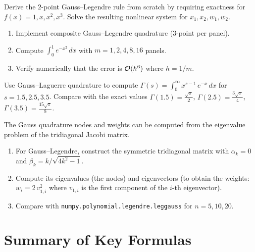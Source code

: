 \begin{exercise}[$\star\star$]
\label{ex:ch8-derive-gl2}
Derive the $2$-point Gauss--Legendre rule from scratch by requiring exactness for $f(x) = 1, x, x^2, x^3$. Solve the resulting nonlinear system for $x_1, x_2, w_1, w_2$.
\end{exercise}

\begin{exercise}[$\star\star$]
\label{ex:ch8-composite}
\begin{enumerate}
    \item Implement composite Gauss--Legendre quadrature (3-point per panel).
    \item Compute $\int_0^1 e^{-x^2}\,dx$ with $m = 1, 2, 4, 8, 16$ panels.
    \item Verify numerically that the error is $\mathcal{O}(h^6)$ where $h = 1/m$.
\end{enumerate}
\end{exercise}

\begin{exercise}[$\star\star$]
\label{ex:ch8-laguerre}
Use Gauss--Laguerre quadrature to compute $\Gamma(s) = \int_0^\infty x^{s-1}\,e^{-x}\,dx$ for $s = 1.5, 2.5, 3.5$. Compare with the exact values $\Gamma(1.5) = \frac{\sqrt{\pi}}{2}$, $\Gamma(2.5) = \frac{3\sqrt{\pi}}{4}$, $\Gamma(3.5) = \frac{15\sqrt{\pi}}{8}$.
\end{exercise}

\begin{exercise}[$\star\star\star$]
\label{ex:ch8-eigenvalue-method}
The Gauss quadrature nodes and weights can be computed from the eigenvalue problem of the tridiagonal Jacobi matrix.
\begin{enumerate}
    \item For Gauss--Legendre, construct the symmetric tridiagonal matrix with $\alpha_k = 0$ and $\beta_k = k/\sqrt{4k^2-1}$.
    \item Compute its eigenvalues (the nodes) and eigenvectors (to obtain the weights: $w_i = 2\,v_{1,i}^2$ where $v_{1,i}$ is the first component of the $i$-th eigenvector).
    \item Compare with \texttt{numpy.polynomial.legendre.leggauss} for $n = 5, 10, 20$.
\end{enumerate}
\end{exercise}

\section*{Summary of Key Formulas}


